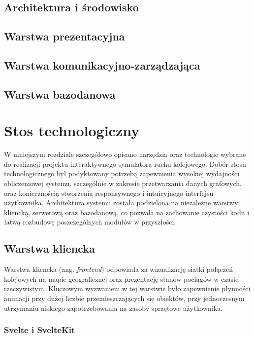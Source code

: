 \documentclass[twoside]{projektInzynierskiMS1z}
\begin{document}
\subsection{Architektura i środowisko}
\subsection{Warstwa prezentacyjna}
\subsection{Warstwa komunikacyjno-zarządzająca}
\subsection{Warstwa bazodanowa}


\section{Stos technologiczny}
W niniejszym rozdziale szczegółowo opisano narzędzia oraz technologie wybrane do
realizacji projektu interaktywnego symulatora ruchu kolejowego. Dobór stosu
technologicznego był podyktowany potrzebą zapewnienia wysokiej wydajności obliczeniowej
systemu, szczególnie w zakresie przetwarzania danych grafowych, oraz koniecznością
stworzenia responsywnego i intuicyjnego interfejsu użytkownika. Architektura systemu
została podzielona na niezależne warstwy: kliencką, serwerową oraz bazodanową, co
pozwala na zachowanie czystości kodu i łatwą rozbudowę poszczególnych modułów
w przyszłości.

\subsection{Warstwa kliencka}

Warstwa kliencka (ang. \emph{frontend}) odpowiada za wizualizację siatki połączeń
kolejowych na mapie geograficznej oraz prezentację stanów pociągów w czasie
rzeczywistym. Kluczowym wyzwaniem w tej warstwie było zapewnienie płynności animacji
przy dużej liczbie przemieszczających się obiektów, przy jednoczesnym utrzymaniu
niskiego zapotrzebowania na zasoby sprzętowe użytkownika.

\subsubsection{Svelte i SvelteKit}
\end{document}
